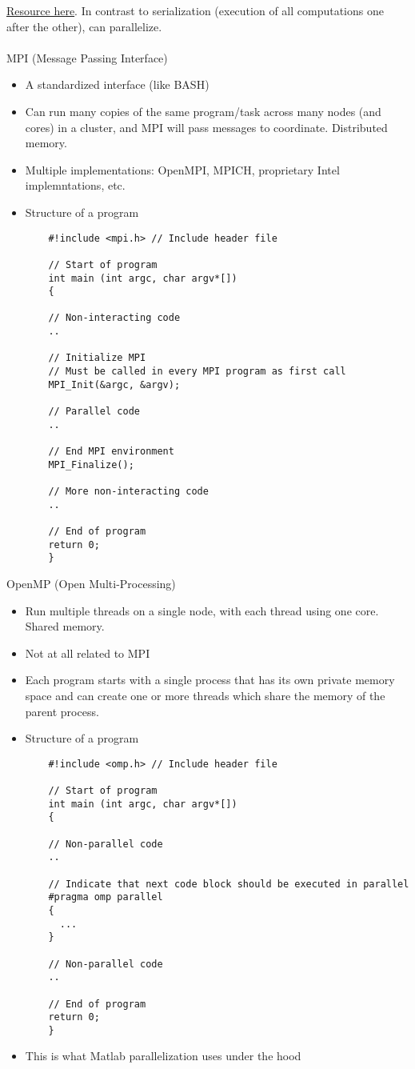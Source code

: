 \documentclass[12pt]{article}
\theoremstyle{plain}
\theoremstyle{definition}
\theoremstyle{remark}
\begin{document}
\href{https://princetonuniversity.github.io/PUbootcamp/sessions/parallel-programming/Intro_PP_bootcamp_2018.pdf}{Resource here}.
In contrast to serialization (execution of all computations one after
the other), can parallelize.
\\
\\
MPI (Message Passing Interface)
\begin{itemize}
  \item A standardized interface (like BASH)
  \item
    Can run many copies of the same program/task across many nodes (and
    cores) in a cluster, and MPI will pass messages to coordinate.
    Distributed memory.
  \item Multiple implementations:
    OpenMPI, MPICH, proprietary Intel implemntations, etc.
  \item Structure of a program
    \begin{lstlisting}
    #!include <mpi.h> // Include header file

    // Start of program
    int main (int argc, char argv*[])
    {

    // Non-interacting code
    ..

    // Initialize MPI
    // Must be called in every MPI program as first call
    MPI_Init(&argc, &argv);

    // Parallel code
    ..

    // End MPI environment
    MPI_Finalize();

    // More non-interacting code
    ..

    // End of program
    return 0;
    }

    \end{lstlisting}
\end{itemize}
OpenMP (Open Multi-Processing)
\begin{itemize}
  \item Run multiple threads on a single node, with each thread using
    one core. Shared memory.
  \item Not at all related to MPI
  \item Each program starts with a single process that has its own
    private memory space and can create one or more threads which share
    the memory of the parent process.
  \item Structure of a program
    \begin{lstlisting}
    #!include <omp.h> // Include header file

    // Start of program
    int main (int argc, char argv*[])
    {

    // Non-parallel code
    ..

    // Indicate that next code block should be executed in parallel
    #pragma omp parallel
    {
      ...
    }

    // Non-parallel code
    ..

    // End of program
    return 0;
    }

    \end{lstlisting}

  \item This is what Matlab parallelization uses under the hood
\end{itemize}
\end{document}
